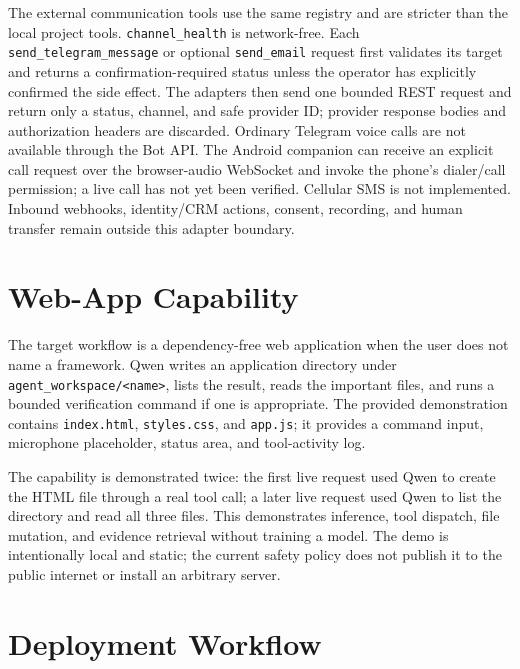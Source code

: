\documentclass[sigconf,nonacm,balance=false]{acmart}
\begin{document}
The external communication tools use the same registry and are stricter than
the local project tools. \texttt{channel\_health} is network-free. Each
\texttt{send\_telegram\_message} or optional \texttt{send\_email} request first
validates its target and returns a confirmation-required status unless the
operator has explicitly confirmed the side effect. The adapters then send one
bounded REST request and return only a status, channel, and safe provider ID;
provider response bodies and authorization headers are discarded. Ordinary
Telegram voice calls are not available through the Bot API. The Android
companion can receive an explicit call request over the browser-audio WebSocket
and invoke the phone's dialer/call permission; a live call has not yet been
verified. Cellular SMS is not implemented. Inbound webhooks,
identity/CRM actions, consent, recording, and human transfer remain outside
this adapter boundary.

\section{Web-App Capability}

The target workflow is a dependency-free web application when the user does not
name a framework. Qwen writes an application directory under
\texttt{agent\_workspace/<name>}, lists the result, reads the important files,
and runs a bounded verification command if one is appropriate. The provided
demonstration contains \texttt{index.html}, \texttt{styles.css}, and
\texttt{app.js}; it provides a command input, microphone placeholder, status
area, and tool-activity log.

The capability is demonstrated twice: the first live request used Qwen to
create the HTML file through a real tool call; a later live request used Qwen
to list the directory and read all three files. This demonstrates inference,
tool dispatch, file mutation, and evidence retrieval without training a model.
The demo is intentionally local and static; the current safety policy does not
publish it to the public internet or install an arbitrary server.

\section{Deployment Workflow}
\end{document}
